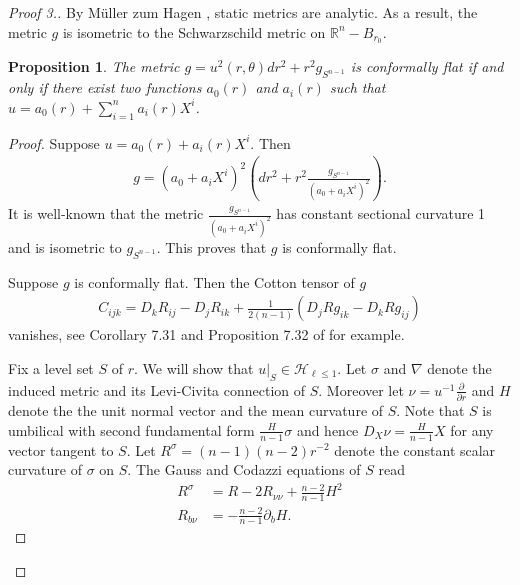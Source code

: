 \documentclass[12pt,twoside]{article}
\theoremstyle{plain}
\newtheorem{prop}[theorem]{Proposition}
\theoremstyle{definition}
\theoremstyle{remark}
\newcommand{\pl}{\partial}
\newcommand{\na}{\nabla}
\newcommand{\lt}{\left}
\newcommand{\rt}{\right}
\newcommand{\R}{\mathbb{R}}
\numberwithin{equation}{section}
\begin{document}
\begin{proof}[Proof 3.] 
By M\"uller zum Hagen \cite{static_analytic}, static metrics are analytic. As a result, the metric $g$ is isometric to the Schwarzschild metric on $\R^n - B_{r_0}$.  
\begin{prop}\label{conformally flat}
The metric $g = u^2(r,\theta) dr^2 + r^2 g_{S^{n-1}}$ is conformally flat if and only if there exist two functions $a_0(r)$ and $a_i(r)$ such that $u = a_0(r) + \sum_{i=1}^n a_i(r) X^i$. \end{prop}
\begin{proof}
    Suppose $u = a_0(r) + a_i(r) X^i.$ Then 
\begin{align*}
g = (a_0 + a_i X^i)^2 \lt( dr^2 + r^2 \frac{g_{S^{n-1}}}{(a_0 + a_i X^i)^2} \rt).
\end{align*}
It is well-known that the metric $\frac{g_{S^{n-1}}}{(a_0 + a_i X^i)^2}$ has constant sectional curvature 1 and is isometric to $g_{S^{n-1}}$. This proves that $g$ is conformally flat.

Suppose $g$ is conformally flat. Then the Cotton tensor of $g$
\begin{align*}
C_{ijk} = D_k R_{ij} - D_j R_{ik} + \frac{1}{2(n-1)} \lt( D_j R g_{ik} - D_k R g_{ij} \rt)
\end{align*}
vanishes, see Corollary 7.31 and Proposition 7.32 of \cite{Lee} for example. 

Fix a level set $S$ of $r$. We will show that $u|_S \in \mathcal{H}_{\ell\le 1}$. Let $\sigma$ and $\na$ denote the induced metric and its Levi-Civita connection of $S$. Moreover let $\nu = u^{-1} \frac{\pl}{\pl r}$ and $H$ denote the the unit normal vector and the mean curvature of $S$. Note that $S$ is umbilical with second fundamental form $\frac{H}{n-1} \sigma$ and hence $D_X \nu = \frac{H}{n-1} X$ for any vector tangent to $S$. Let $R^\sigma = (n-1)(n-2) r^{-2}$ denote the constant scalar curvature of $\sigma$ on $S$. The Gauss and Codazzi equations of $S$ read
\begin{align*}
R^\sigma &= R - 2 R_{\nu\nu} + \frac{n-2}{n-1}H^2\\
R_{b\nu} &= - \frac{n-2}{n-1} \pl_b H.
\end{align*}


\end{proof}
\end{proof}
\end{document}
